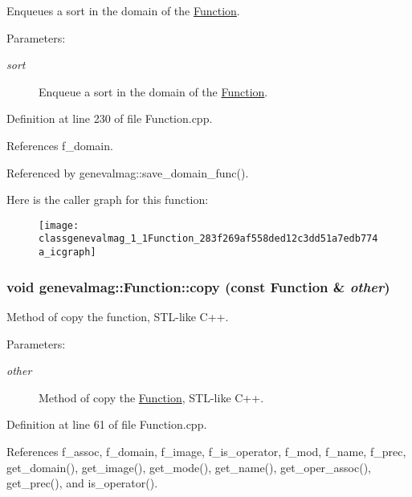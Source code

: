 Enqueues a sort in the domain of the \hyperlink{classgenevalmag_1_1Function}{Function}. \begin{Desc}
\item[Parameters:]
\begin{description}
\item[{\em sort}]Enqueue a sort in the domain of the \hyperlink{classgenevalmag_1_1Function}{Function}. \end{description}
\end{Desc}


Definition at line 230 of file Function.cpp.

References f\_\-domain.

Referenced by genevalmag::save\_\-domain\_\-func().

Here is the caller graph for this function:\nopagebreak
\begin{figure}[H]
\begin{center}
\leavevmode
\texttt{[image: classgenevalmag\_1\_1Function\_283f269af558ded12c3dd51a7edb774a\_icgraph]}
\end{center}
\end{figure}
\hypertarget{classgenevalmag_1_1Function_3a30e9b7d22c2426c34b025bc460ecda}{
\subsubsection[{copy}]{\setlength{\rightskip}{0pt plus 5cm}void genevalmag::Function::copy (const {\bf Function} \& {\em other})}}
\label{classgenevalmag_1_1Function_3a30e9b7d22c2426c34b025bc460ecda}


Method of copy the function, STL-like C++. \begin{Desc}
\item[Parameters:]
\begin{description}
\item[{\em other}]Method of copy the \hyperlink{classgenevalmag_1_1Function}{Function}, STL-like C++. \end{description}
\end{Desc}


Definition at line 61 of file Function.cpp.

References f\_\-assoc, f\_\-domain, f\_\-image, f\_\-is\_\-operator, f\_\-mod, f\_\-name, f\_\-prec, get\_\-domain(), get\_\-image(), get\_\-mode(), get\_\-name(), get\_\-oper\_\-assoc(), get\_\-prec(), and is\_\-operator().

